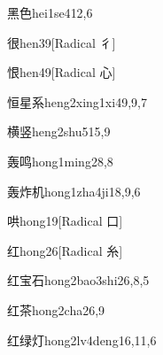 \begin{verbete}{黑色}{hei1se4}{12,6}
\end{verbete}

\begin{verbete}{很}{hen3}{9}[Radical 彳]
\end{verbete}

\begin{verbete}{恨}{hen4}{9}[Radical 心]
\end{verbete}

\begin{verbete}{恒星系}{heng2xing1xi4}{9,9,7}
\end{verbete}

\begin{verbete}{横竖}{heng2shu5}{15,9}
\end{verbete}

\begin{verbete}{轰鸣}{hong1ming2}{8,8}
\end{verbete}

\begin{verbete}{轰炸机}{hong1zha4ji1}{8,9,6}
\end{verbete}

\begin{verbete}{哄}{hong1}{9}[Radical 口]
\end{verbete}

\begin{verbete}{红}{hong2}{6}[Radical 糸]
\end{verbete}

\begin{verbete}{红宝石}{hong2bao3shi2}{6,8,5}
\end{verbete}

\begin{verbete}{红茶}{hong2cha2}{6,9}
\end{verbete}

\begin{verbete}{红绿灯}{hong2lv4deng1}{6,11,6}
\end{verbete}

